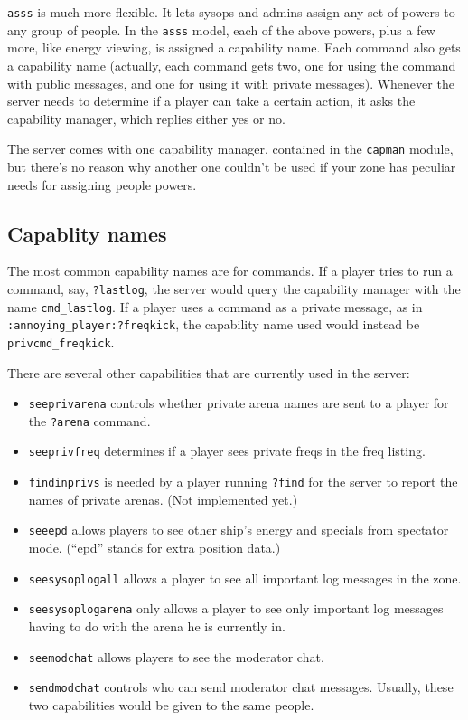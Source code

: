 \documentclass{article}
\newcommand{\asss}{\texttt{asss}}
\begin{document}
\asss{} is much more flexible. It lets sysops and admins assign any set
of powers to any group of people. In the \asss{} model, each of the
above powers, plus a few more, like energy viewing, is assigned a
capability name. Each command also gets a capability name (actually,
each command gets two, one for using the command with public messages,
and one for using it with private messages). Whenever the server needs
to determine if a player can take a certain action, it asks the
capability manager, which replies either yes or no.

The server comes with one capability manager, contained in the
\texttt{capman} module, but there's no reason why another one couldn't
be used if your zone has peculiar needs for assigning people powers.

\subsection{Capablity names}

The most common capability names are for commands. If a player tries
to run a command, say, \verb/?lastlog/, the server would query the
capability manager with the name \verb/cmd_lastlog/. If a player uses a
command as a private message, as in \verb/:annoying_player:?freqkick/,
the capability name used would instead be \verb/privcmd_freqkick/.

There are several other capabilities that are currently used in the
server:

\begin{itemize}
\item{\texttt{seeprivarena}} controls whether private arena names are
sent to a player for the \verb/?arena/ command.
\item{\texttt{seeprivfreq}} determines if a player sees private freqs in
the freq listing.
\item{\texttt{findinprivs}} is needed by a player running \verb/?find/
for the server to report the names of private arenas. (Not implemented
yet.)
\item{\texttt{seeepd}} allows players to see other ship's energy and
specials from spectator mode. (``epd'' stands for extra position data.)
\item{\texttt{seesysoplogall}} allows a player to see all important log
messages in the zone.
\item{\texttt{seesysoplogarena}} only allows a player to see only
important log messages having to do with the arena he is currently in.
\item{\texttt{seemodchat}} allows players to see the moderator chat.
\item{\texttt{sendmodchat}} controls who can send moderator chat
messages. Usually, these two capabilities would be given to the same
people.
\end{itemize}
\end{document}
